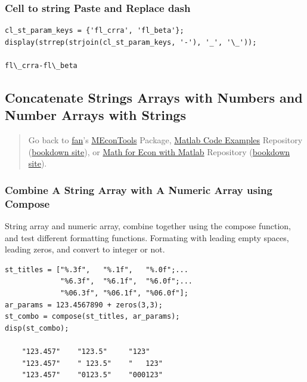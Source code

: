 \documentclass[
]{book}
\begin{document}
\hypertarget{cell-to-string-paste-and-replace-dash}{%
\subsubsection{Cell to string Paste and Replace dash}\label{cell-to-string-paste-and-replace-dash}}

\begin{verbatim}
cl_st_param_keys = {'fl_crra', 'fl_beta'};
display(strrep(strjoin(cl_st_param_keys, '-'), '_', '\_'));

fl\_crra-fl\_beta
\end{verbatim}

\hypertarget{concatenate-strings-arrays-with-numbers-and-number-arrays-with-strings}{%
\subsection{Concatenate Strings Arrays with Numbers and Number Arrays with Strings}\label{concatenate-strings-arrays-with-numbers-and-number-arrays-with-strings}}

\begin{quote}
Go back to \href{http://fanwangecon.github.io/}{fan}'s \href{https://fanwangecon.github.io/MEconTools/}{MEconTools} Package, \href{https://fanwangecon.github.io/M4Econ/}{Matlab Code Examples} Repository (\href{https://fanwangecon.github.io/M4Econ/bookdown}{bookdown site}), or \href{https://fanwangecon.github.io/Math4Econ/}{Math for Econ with Matlab} Repository (\href{https://fanwangecon.github.io/Math4Econ/bookdown}{bookdown site}).
\end{quote}

\hypertarget{combine-a-string-array-with-a-numeric-array-using-compose}{%
\subsubsection{Combine A String Array with A Numeric Array using Compose}\label{combine-a-string-array-with-a-numeric-array-using-compose}}

String array and numeric array, combine together using the compose
function, and test different formatting functions. Formating with
leading empty spaces, leading zeros, and convert to integer or not.

\begin{verbatim}
st_titles = ["%.3f",   "%.1f",   "%.0f";...
             "%6.3f",  "%6.1f",  "%6.0f";...
             "%06.3f", "%06.1f", "%06.0f"];
ar_params = 123.4567890 + zeros(3,3);
st_combo = compose(st_titles, ar_params);
disp(st_combo);

    "123.457"    "123.5"     "123"   
    "123.457"    " 123.5"    "   123"
    "123.457"    "0123.5"    "000123"
\end{verbatim}
\end{document}
